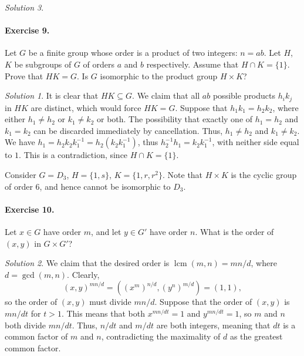\documentclass[11pt]{report}
\DeclareMathOperator\lcm{lcm}
\theoremstyle{remark}
\newtheorem*{solution}{Solution}
\begin{document}
\begin{solution}
    \paragraph{Exercise 9.} Let $G$ be a finite group whose order is a product of
    two integers: $n = ab$. Let $H$, $K$ be subgroups of $G$ of orders $a$ and $b$
    respectively. Assume that $H \cap K = \{1\}$. Prove that $HK = G$. Is $G$
    isomorphic to the product group $H \times K$?
    \begin{solution}
        It is clear that $HK \subseteq G$. We claim that all $ab$ possible products
        $h_ik_j$ in $HK$ are distinct, which would force $HK = G$. Suppose that
        $h_1k_1 = h_2k_2$, where either $h_1 \neq h_2$ or $k_1 \neq k_2$ or both.
        The possibility that exactly one of $h_1 = h_2$ and $k_1 = k_2$ can be
        discarded immediately by cancellation. Thus, $h_1 \neq h_2$ and $k_1 \neq
        k_2$. We have $h_1 = h_2k_2k_1^{-1} = h_2 (k_2k_1^{-1})$, thus $h_2^{-1}h_1
        = k_2k_1^{-1}$, with neither side equal to $1$. This is a contradiction,
        since $H \cap K = \{1\}$.

        Consider $G = D_3$, $H = \{1, s\}$, $K = \{1, r, r^2\}$. Note that $H \times
        K$ is the cyclic group of order $6$, and hence cannot be isomorphic to
        $D_3$.
    \end{solution}

    \paragraph{Exercise 10.} Let $x \in G$ have order $m$, and let $y \in G'$ have
    order $n$. What is the order of $(x, y)$ in $G \times G'$?
    \begin{solution}
        We claim that the desired order is $\lcm(m, n) = mn / d$, where $d = \gcd(m,
        n)$. Clearly, \[
            (x, y)^{mn / d} = ((x^m)^{n / d}, (y^n)^{m / d}) = (1, 1),
        \] so the order of $(x, y)$ must divide $mn / d$. Suppose that the order of
        $(x, y)$ is $mn / dt$ for $t > 1$. This means that both $x^{mn / dt} = 1$
        and $y^{mn / dt} = 1$, so $m$ and $n$ both divide $mn / dt$. Thus, $n / dt$
        and $m / dt$ are both integers, meaning that $dt$ is a common factor of $m$
        and $n$, contradicting the maximality of $d$ as the greatest common factor.
    \end{solution}
    

\end{solution}
\end{document}

